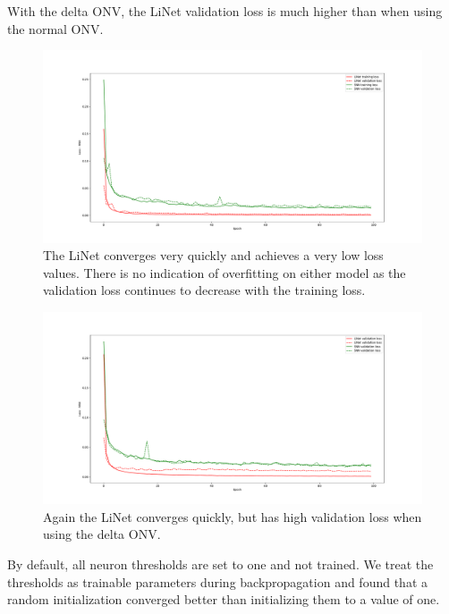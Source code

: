 \documentclass [MS] {UCLAthesis}
\begin{document}
With the delta ONV, the LiNet validation loss is much higher than when using the normal ONV. 

\begin{figure}
    \centering
    \includegraphics[width=\textwidth]{loss_normal}
    \caption[Training and validation loss using normal ONVs]{The LiNet converges very quickly and achieves a very low loss values. There is no indication of overfitting on either model as the validation loss continues to decrease with the training loss.}
    \label{fig:loss_normal}
\end{figure}

\begin{figure}
    \centering
    \includegraphics[width=\textwidth]{loss_delta}
    \caption[Training and validation loss using delta ONVs]{Again the LiNet converges quickly, but has high validation loss when using the delta ONV.}
    \label{fig:loss_delta}
\end{figure}

By default, all neuron thresholds are set to one and not trained. We treat the thresholds as trainable parameters during backpropagation and found that a random initialization converged better than initializing them to a value of one.
\end{document}
